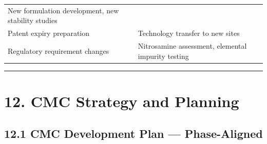 \documentclass[
  11pt,
  a4paper,
]{report}
\begin{document}
\begin{longtable}[]{@{}ll@{}}
\begin{minipage}[t]{0.50\columnwidth}
New formulation development, new stability studies\strut
\end{minipage}\tabularnewline
\begin{minipage}[t]{0.44\columnwidth}\raggedright
Patent expiry preparation\strut
\end{minipage} & \begin{minipage}[t]{0.50\columnwidth}\raggedright
Technology transfer to new sites\strut
\end{minipage}\tabularnewline
\begin{minipage}[t]{0.44\columnwidth}\raggedright
Regulatory requirement changes\strut
\end{minipage} & \begin{minipage}[t]{0.50\columnwidth}\raggedright
Nitrosamine assessment, elemental impurity testing\strut
\end{minipage}\tabularnewline
\bottomrule
\end{longtable}

\begin{center}\rule{0.5\linewidth}{0.5pt}\end{center}

\hypertarget{cmc-strategy-and-planning}{%
\section{12. CMC Strategy and
Planning}\label{cmc-strategy-and-planning}}

\hypertarget{cmc-development-plan-phase-aligned}{%
\subsection{12.1 CMC Development Plan ---
Phase-Aligned}\label{cmc-development-plan-phase-aligned}}
\end{document}
